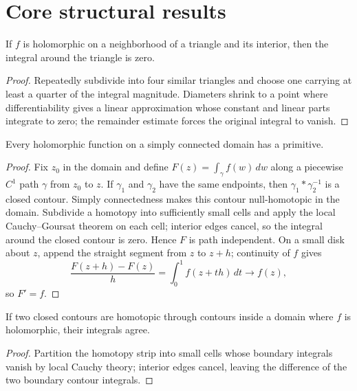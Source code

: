 \section{Core structural results}

\begin{theorem}\label{thm:iv05-01}
If $f$ is holomorphic on a neighborhood of a triangle and its interior, then the integral around the triangle is zero.
\begin{proof}
Repeatedly subdivide into four similar triangles and choose one carrying at least a quarter of the integral magnitude. Diameters shrink to a point where differentiability gives a linear approximation whose constant and linear parts integrate to zero; the remainder estimate forces the original integral to vanish.
\end{proof}
\end{theorem}

\begin{theorem}\label{thm:iv05-02}
Every holomorphic function on a simply connected domain has a primitive.
\begin{proof}
Fix $z_0$ in the domain and define $F(z)=\int_\gamma f(w)\,dw$ along a piecewise $C^1$ path $\gamma$ from $z_0$ to $z$. If $\gamma_1$ and $\gamma_2$ have the same endpoints, then $\gamma_1*\gamma_2^{-1}$ is a closed contour. Simply connectedness makes this contour null-homotopic in the domain. Subdivide a homotopy into sufficiently small cells and apply the local Cauchy--Goursat theorem on each cell; interior edges cancel, so the integral around the closed contour is zero. Hence $F$ is path independent. On a small disk about $z$, append the straight segment from $z$ to $z+h$; continuity of $f$ gives
\[
\frac{F(z+h)-F(z)}{h}=\int_0^1 f(z+th)\,dt\longrightarrow f(z),
\]
so $F'=f$.
\end{proof}
\end{theorem}

\begin{theorem}\label{thm:iv05-03}
If two closed contours are homotopic through contours inside a domain where $f$ is holomorphic, their integrals agree.
\begin{proof}
Partition the homotopy strip into small cells whose boundary integrals vanish by local Cauchy theory; interior edges cancel, leaving the difference of the two boundary contour integrals.
\end{proof}
\end{theorem}

